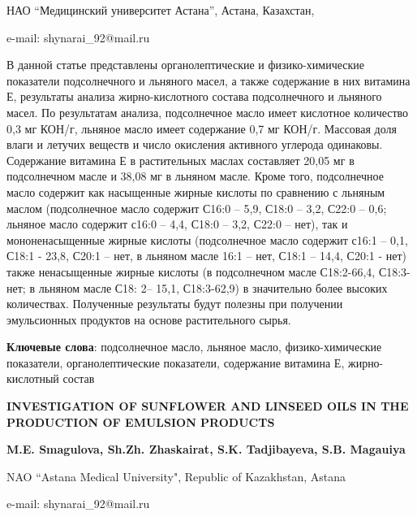 \begin{affiliation}
НАО ``Медицинский университет Астана'', Астана, Казахстан,

e-mail: shynarai\_92@mail.ru
\end{affiliation}

В данной статье представлены органолептические и физико-химические
показатели подсолнечного и льняного масел, а также содержание в них
витамина Е, результаты анализа жирно-кислотного состава подсолнечного и
льняного масел. По результатам анализа, подсолнечное масло имеет
кислотное количество 0,3 мг КОН/г, льняное масло имеет содержание 0,7 мг
КОН/г. Массовая доля влаги и летучих веществ и число окисления активного
углерода одинаковы. Содержание витамина Е в растительных маслах
составляет 20,05 мг в подсолнечном масле и 38,08 мг в льняном масле.
Кроме того, подсолнечное масло содержит как насыщенные жирные кислоты по
сравнению с льняным маслом (подсолнечное масло содержит С16:0 -- 5,9,
С18:0 -- 3,2, С22:0 -- 0,6; льняное масло содержит с16:0 -- 4,4, С18:0
-- 3,2, С22:0 -- нет), так и мононенасыщенные жирные кислоты
(подсолнечное масло содержит с16:1 -- 0,1, С18:1 - 23,8, С20:1 -- нет, в
льняном масле 16:1 -- нет, С18:1 -- 14,4, С20:1 - нет) также
ненасыщенные жирные кислоты (в подсолнечном масле С18:2-66,4, С18:3-нет;
в льняном масле С18: 2-- 15,1, С18:3-62,9) в значительно более высоких
количествах. Полученные результаты будут полезны при получении
эмульсионных продуктов на основе растительного сырья.

{\bfseries Ключевые слова}: подсолнечное масло, льняное масло,
физико-химические показатели, органолептические показатели, содержание
витамина Е, жирно-кислотный состав

\begin{articleheader}
{\bfseries INVESTIGATION OF SUNFLOWER AND LINSEED OILS IN THE PRODUCTION OF
EMULSION PRODUCTS}

{\bfseries
M.E. Smagulova,
Sh.Zh. Zhaskairat\textsuperscript{\envelope },
S.K. Tadjibayeva,
S.B. Magauiya
}
\end{articleheader}

\begin{affiliation}
NAO ``Astana Medical University", Republic of Kazakhstan, Astana

e-mail: shynarai\_92@mail.ru
\end{affiliation}

